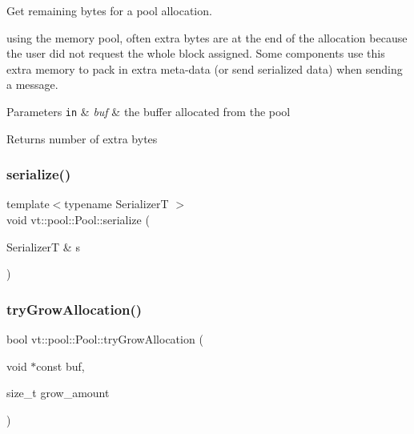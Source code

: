 Get remaining bytes for a pool allocation. 

using the memory pool, often extra bytes are at the end of the allocation because the user did not request the whole block assigned. Some components use this extra memory to pack in extra meta-\/data (or send serialized data) when sending a message.


\begin{DoxyParams}[1]{Parameters}
\mbox{\tt in}  & {\em buf} & the buffer allocated from the pool\\
\hline
\end{DoxyParams}
\begin{DoxyReturn}{Returns}
number of extra bytes 
\end{DoxyReturn}
\mbox{\label{structvt_1_1pool_1_1_pool_a7a81f11ae46f0c953c600b223bc09c70}} 
\subsubsection{\texorpdfstring{serialize()}{serialize()}}
{\footnotesize\ttfamily template$<$typename SerializerT $>$ \\
void vt\+::pool\+::\+Pool\+::serialize (\begin{DoxyParamCaption}\item[{SerializerT \&}]{s }\end{DoxyParamCaption})\hspace{0.3cm}{\ttfamily [inline]}}

\mbox{\label{structvt_1_1pool_1_1_pool_a62e1e77caac8e11f24be61acd6f4474b}} 
\subsubsection{\texorpdfstring{try\+Grow\+Allocation()}{tryGrowAllocation()}}
{\footnotesize\ttfamily bool vt\+::pool\+::\+Pool\+::try\+Grow\+Allocation (\begin{DoxyParamCaption}\item[{void $\ast$const}]{buf,  }\item[{size\+\_\+t}]{grow\+\_\+amount }\end{DoxyParamCaption})}



